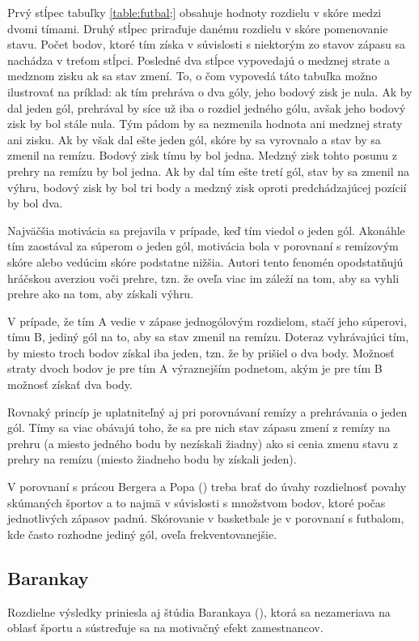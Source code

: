 \documentclass[
  digital, %
  twoside, %
  notable,   %
  lof,     %
  lot,     %
]{fithesis3}
\begin{document}
		Prvý stĺpec tabuľky \ref{table:futbal;} obsahuje hodnoty rozdielu v skóre medzi dvomi tímami. Druhý stĺpec priraďuje danému rozdielu v skóre pomenovanie stavu. Počet bodov, ktoré tím získa v súvislosti s niektorým zo stavov zápasu sa nachádza v treťom stĺpci. Posledné dva stĺpce vypovedajú o medznej strate a medznom zisku ak sa stav zmení. To, o čom vypovedá táto tabuľka možno ilustrovať na príklad: ak tím prehráva o dva góly, jeho bodový zisk je nula. Ak by dal jeden gól, prehrával by síce už iba o rozdiel jedného gólu, avšak jeho bodový zisk by bol stále nula. Tým pádom by sa nezmenila hodnota ani medznej straty ani zisku. Ak by však dal ešte jeden gól, skóre by sa vyrovnalo a stav by sa zmenil na remízu. Bodový zisk tímu by bol jedna. Medzný zisk tohto posunu z prehry na remízu by bol jedna. Ak by dal tím ešte tretí gól, stav by sa zmenil na výhru, bodový zisk by bol tri body a medzný zisk oproti predchádzajúcej pozícií by bol dva.
		
		Najväčšia motivácia sa prejavila v prípade, keď tím viedol o jeden gól. Akonáhle tím zaostával za súperom o jeden gól, motivácia bola v porovnaní s remízovým skóre alebo vedúcim skóre podstatne nižšia. Autori tento fenomén opodstatňujú hráčskou averziou voči prehre, tzn. že oveľa viac im záleží na tom, aby sa vyhli prehre ako na tom, aby získali výhru. 
		
		V prípade, že tím A vedie v zápase jednogólovým rozdielom, stačí jeho súperovi, tímu B, jediný gól na to, aby sa stav zmenil na remízu. Doteraz vyhrávajúci tím, by miesto troch bodov získal iba jeden, tzn. že by prišiel o dva body. Možnosť straty dvoch bodov je pre tím A výraznejším podnetom, akým je pre tím B možnosť získať dva body. 
	
		Rovnaký princíp je uplatniteľný aj pri porovnávaní remízy a prehrávania o jeden gól. Tímy sa viac obávajú toho, že sa pre nich stav zápasu zmení z remízy na prehru (a miesto jedného bodu by nezískali žiadny) ako si cenia zmenu stavu z prehry na remízu (miesto žiadneho bodu by získali jeden). \parencite[s.~1768]{schneemann2017}
		
		V porovnaní s prácou Bergera a Popa (\citeyear{berger2011}) treba brať do úvahy rozdielnosť povahy skúmaných športov a to najmä v súvislosti s množstvom bodov, ktoré počas jednotlivých zápasov padnú. Skórovanie v basketbale je v porovnaní s futbalom, kde často rozhodne jediný gól, oveľa frekventovanejšie.
		
		\subsection{Barankay}
		Rozdielne výsledky priniesla aj štúdia Barankaya (\citeyear{barankay2010}), ktorá sa nezameriava na oblasť športu a sústreďuje sa na motivačný efekt zamestnancov. 
		
\end{document}
